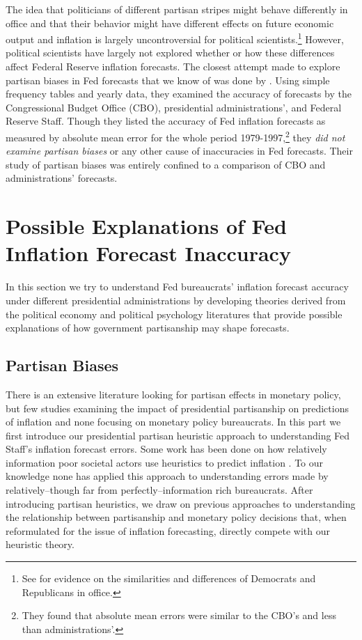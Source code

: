 \documentclass[a4paper]{article}\usepackage{graphicx, color}
\begin{document}
The idea that politicians of different partisan stripes might behave differently in office and that their behavior might have different effects on future economic output and inflation is largely uncontroversial for political scientists.\footnote{See \cite{Bartels2008} for evidence on the similarities and differences of Democrats and Republicans in office.} However, political scientists have largely not explored whether or how these differences affect Federal Reserve inflation forecasts. The closest attempt made to explore partisan biases in Fed forecasts that we know of was done by \cite{Frendreis2000}. Using simple frequency tables and yearly data, they examined the accuracy of forecasts by the Congressional Budget Office (CBO), presidential administrations', and Federal Reserve Staff. Though they listed the accuracy of Fed inflation forecasts as measured by absolute mean error for the whole period 1979-1997,\footnote{They found that absolute mean errors were similar to the CBO's and less than administrations'.} they \emph{did not examine partisan biases} or any other cause of inaccuracies in Fed forecasts. Their study of partisan biases was entirely confined to a comparison of CBO and administrations' forecasts. 

\section{Possible Explanations of Fed Inflation Forecast Inaccuracy}

In this section we try to understand Fed bureaucrats' inflation forecast accuracy under different presidential administrations by developing theories derived from the political economy and political psychology literatures that provide possible explanations of how government partisanship may shape forecasts.

\subsection{Partisan Biases}

There is an extensive literature looking for partisan effects in monetary policy, but few studies examining the impact of presidential partisanship on predictions of inflation and none focusing on monetary policy bureaucrats. In this part we first introduce our presidential partisan heuristic approach to understanding Fed Staff's inflation forecast errors. Some work has been done on how relatively information poor societal actors use heuristics to predict inflation \cite[see][]{Brazier2008,Grauwe2011}. To our knowledge none has applied this approach to understanding errors made by relatively--though far from perfectly--information rich bureaucrats. After introducing partisan heuristics, we draw on previous approaches to understanding the relationship between partisanship and monetary policy decisions that, when reformulated for the issue of inflation forecasting, directly compete with our heuristic theory.
\end{document}
